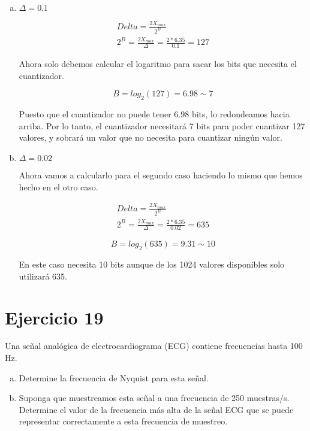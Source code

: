 \documentclass[11pt,a4paper]{article}
\begin{document}
\begin{enumerate}[a)]
	\item $\Delta = 0.1$
	
	\begin{gather*}
	Delta = \frac{2X_{max}}{2^B} \\
	2^B = \frac{2X_{max}}{\Delta} = \frac{2*6.35}{0.1} = 127
	\end{gather*}

Ahora solo debemos calcular el logaritmo para sacar los bits que necesita el cuantizador.

	\[B = log_2(127) = 6.98\sim 7\]
	
Puesto que el cuantizador no puede tener 6.98 bits, lo redondeamos hacia arriba. Por lo tanto, el cuantizador necesitará 7 bits para poder cuantizar 127 valores, y sobrará un valor que no necesita para cuantizar ningún valor.
	
	\item $\Delta = 0.02$
	
	Ahora vamos a calcularlo para el segundo caso haciendo lo mismo que hemos hecho en el otro caso.
	
	\begin{gather*}
	Delta = \frac{2X_{max}}{2^B} \\
	2^B = \frac{2X_{max}}{\Delta} = \frac{2*6.35}{0.02} = 635
	\end{gather*}

	\[B = log_2(635) = 9.31\sim 10\]
	
En este caso necesita 10 bits aunque de los 1024 valores disponibles solo utilizará 635.
\end{enumerate}

\newpage

\section{Ejercicio 19}

Una señal analógica de electrocardiograma (ECG) contiene frecuencias hasta 100 Hz.

\begin{enumerate}[a)]
	\item Determine la frecuencia de Nyquist para esta señal.
	\item Suponga que muestreamos esta señal a una frecuencia de 250 muestras/s. Determine el valor de la frecuencia más alta de la señal ECG que se puede representar correctamente a esta frecuencia de muestreo.\\
\end{enumerate}
\end{document}
